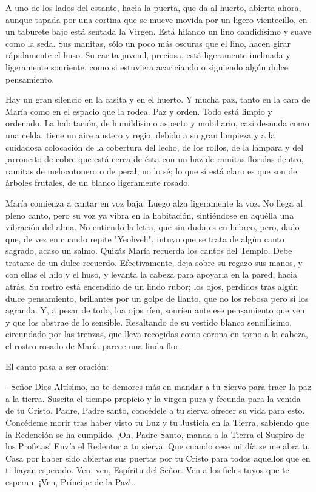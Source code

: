 \documentclass[12pt]{book} %
\begin{document}
A uno de los lados del estante, hacia la puerta, que da al huerto, abierta ahora, aunque tapada por una cortina que se mueve movida por un ligero vientecillo, en un taburete bajo está sentada la Virgen. Está hilando un lino candidísimo y suave como la seda. Sus manitas, sólo un poco más oscuras que el lino, hacen girar rápidamente el huso. Su carita juvenil, preciosa, está ligeramente inclinada y ligeramente sonriente, como si estuviera acariciando o siguiendo algún dulce pensamiento. 

Hay un gran silencio en la casita y en el huerto. Y mucha paz, tanto en la cara de María como en el espacio que la rodea. Paz y orden. Todo está limpio y ordenado. La habitación, de humildísimo aspecto y mobiliario, casi desnuda como una celda, tiene un aire austero y regio, debido a su gran limpieza y a la cuidadosa colocación de la cobertura del lecho, de los rollos, de la lámpara y del jarroncito de cobre que está cerca de ésta con un haz de ramitas floridas dentro, ramitas de melocotonero o de peral, no lo sé; lo que sí está claro es que son de árboles frutales, de un blanco ligeramente rosado. 

María comienza a cantar en voz baja. Luego alza ligeramente la voz. No llega al pleno canto, pero su voz ya vibra en la habitación, sintiéndose en aquélla una vibración del alma. No entiendo la letra, que sin duda es en hebreo, pero, dado que, de vez en cuando repite "Yeohveh", intuyo que se trata de algún canto sagrado, acaso un salmo. Quizás María recuerda los cantos del Templo. Debe tratarse de un dulce recuerdo. Efectivamente, deja sobre su regazo sus manos, y con ellas el hilo y el huso, y levanta la cabeza para apoyarla en la pared, hacia atrás. Su rostro está encendido de un lindo rubor; los ojos, perdidos tras algún dulce pensamiento, brillantes por un golpe de llanto, que no los rebosa pero sí los agranda. Y, a pesar de todo, loa ojos ríen, sonríen ante ese pensamiento que ven y que los abstrae de lo sensible. Resaltando de su vestido blanco sencillísimo, circundado por las trenzas, que lleva recogidas como corona en torno a la cabeza, el rostro rosado de María parece una linda flor. 

El canto pasa a ser oración: 

- Señor Dios Altísimo, no te demores más en mandar a tu Siervo para traer la paz a la tierra. Suscita el tiempo propicio y la virgen pura y fecunda para la venida de tu Cristo. Padre, Padre santo, concédele a tu sierva ofrecer su vida para esto. Concédeme morir tras haber visto tu Luz y tu Justicia en la Tierra, sabiendo que la Redención se ha cumplido. ¡Oh, Padre Santo, manda a la Tierra el Suspiro de los Profetas! Envía el Redentor a tu sierva. Que cuando cese mi día se me abra tu Casa por haber sido abiertas sus puertas por tu Cristo para todos aquellos que en ti hayan esperado. Ven, ven, Espíritu del Señor. Ven a los fieles tuyos que te esperan. ¡Ven, Príncipe de la Paz!.. 
\end{document}
